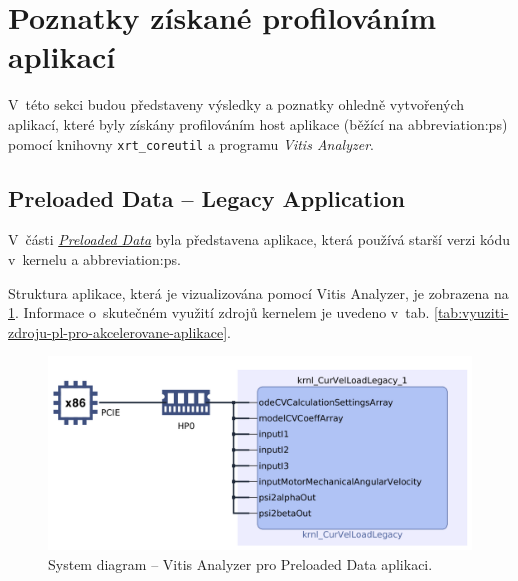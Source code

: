 \documentclass[a4paper, twoside, 11pt]{article}
\newcommand{\fbar}{\FloatBarrier}
\begin{document}
	\fbar
\section{Poznatky získané profilováním aplikací}\label{sec:poznatky-ziskane-profilovanim-aplikaci}
V~této sekci budou představeny výsledky a poznatky ohledně vytvořených aplikací, které byly získány profilováním host aplikace (běžící na \gls{abbreviation:ps}) pomocí knihovny \texttt{xrt\_coreutil} a programu \textit{Vitis Analyzer}.\par

	\subsection{Preloaded Data – Legacy Application}\label{subsec:poznatky-ziskane-profilovanim-aplikaci-preloaded-data-legacy-application}
		V~části \hyperref[subsec:preloaded-data]{\textit{Preloaded Data}} byla představena aplikace, která používá starší verzi kódu v~kernelu a \gls{abbreviation:ps}.\par
		Struktura aplikace, která je vizualizována pomocí Vitis Analyzer, je zobrazena na \ref{fig:legacy-rt-step-0.000001-system-diagram-crop}. Informace o~skutečném využití zdrojů kernelem je uvedeno v~tab. \ref{tab:vyuziti-zdroju-pl-pro-akcelerovane-aplikace}.\par

		\begin{figure}[htbp!]
			\centering
			\includegraphics[width=1\textwidth]{src/png/vitis-analyzer/legacy-rt/1M-data/writing-data-output/legacy-rt-step-0.000001-system-diagram-crop.png}
			\caption{System diagram – Vitis Analyzer pro Preloaded Data aplikaci.}
			\label{fig:legacy-rt-step-0.000001-system-diagram-crop}
		\end{figure}
\end{document}
